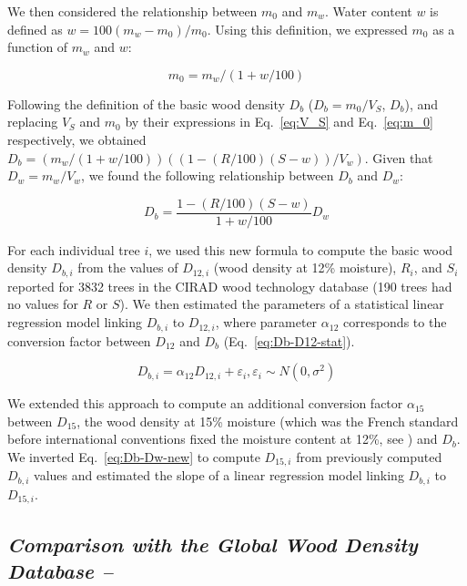 \documentclass[a4paper, 12pt, leqno, dvipsnames]{article}\usepackage[]{graphicx}\usepackage[]{color}
\begin{document}
We then considered the relationship between $m_0$ and $m_w$. Water content $w$ is defined as $w=100(m_w-m_0)/m_0$. Using this definition, we expressed $m_0$ as a function of $m_w$ and $w$: 

\begin{equation}
  m_0=m_w/(1+w/100)
  \label{eq:m_0}
\end{equation}

Following the definition of the basic wood density $D_b$ ($D_b=m_0/V_S$, $D_b$), and replacing $V_S$ and $m_0$ by their expressions in Eq.~\ref{eq:V_S} and Eq.~\ref{eq:m_0} respectively, we obtained $D_b=(m_w/(1+w/100))((1-(R/100)(S-w))/V_w)$. Given that $D_w=m_w/V_w$, we found the following relationship between $D_b$ and $D_w$:

\begin{equation}
  D_b=\frac{1-(R/100)(S-w)}{1+w/100}D_w
  \label{eq:Db-Dw-new}
\end{equation}

For each individual tree $i$, we used this new formula to compute the basic wood density $D_{b,i}$ from the values of $D_{12,i}$ (wood density at 12\% moisture), $R_i$, and $S_i$ reported for 3832 trees in the CIRAD wood technology database (190 trees had no values for $R$ or $S$). We then estimated the parameters of a statistical linear regression model linking $D_{b,i}$ to $D_{12,i}$, where parameter $\alpha_{12}$ corresponds to the conversion factor between $D_{12}$ and $D_b$ (Eq.~\ref{eq:Db-D12-stat}).

\begin{equation}
  D_{b,i}=\alpha_{12} D_{12,i} + \varepsilon_i, \varepsilon_i \sim N(0,\sigma^2)
  \label{eq:Db-D12-stat}
\end{equation}

We extended this approach to compute an additional conversion factor $\alpha_{15}$ between $D_{15}$, the wood density at 15\% moisture (which was the French standard before international conventions fixed the moisture content at 12\%, see \citet{Sallenave1955}) and $D_b$. We inverted Eq.~\ref{eq:Db-Dw-new} to compute $D_{15,i}$ from previously computed $D_{b,i}$ values and estimated the slope of a linear regression model linking $D_{b,i}$ to $D_{15,i}$.

\subsection*{\textit{Comparison with the Global Wood Density Database --}}
\end{document}
